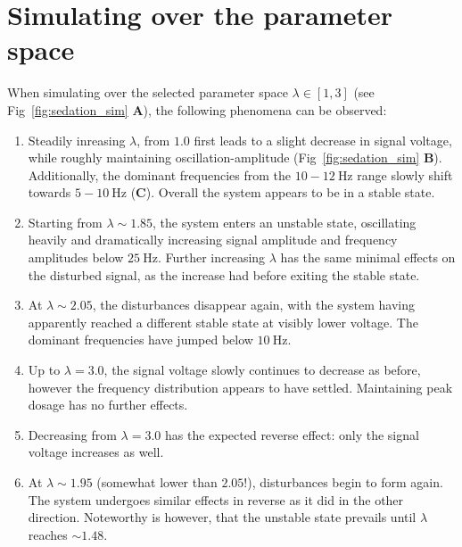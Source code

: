 \section{Simulating over the parameter space}\label{sec:simulating-over-the-parameter-space}

When simulating over the selected parameter space $ \lambda \in \left[ 1, 3 \right] $ (see Fig~\ref{fig:sedation_sim}
\textbf{A}),
the following phenomena can be observed:

\begin{enumerate}
    \item Steadily inreasing $ \lambda $, from $1.0$ first leads to a slight decrease in signal voltage, while roughly
    maintaining
    oscillation-amplitude (Fig~\ref{fig:sedation_sim} \textbf{B}).
    Additionally, the dominant frequencies from the $ 10-12 \SI{}{\hertz} $ range slowly shift towards $ 5-10
    \SI{}{\hertz} $ (\textbf{C}).
    Overall the system appears to be in a stable state.

    \item Starting from $ \lambda \sim 1.85 $, the system enters an unstable state, oscillating heavily and dramatically
    increasing signal amplitude and frequency amplitudes below $ \SI{25}{\hertz} $.
    Further increasing $\lambda$ has the same minimal effects on the disturbed signal,
    as the increase had before exiting the stable state.

    \item At $\lambda \sim 2.05 $, the disturbances disappear again, with the system having apparently reached a different
    stable state at visibly lower voltage.
    The dominant frequencies have jumped below $\SI{10}{\hertz}$.

    \item Up to $\lambda = 3.0$, the signal voltage slowly continues to decrease as before,
    however the frequency distribution appears to have settled.
    Maintaining peak dosage has no further effects.

    \item Decreasing from $\lambda = 3.0$ has the expected reverse effect: only the signal voltage increases as well.

    \item At $\lambda \sim 1.95$ (somewhat lower than $2.05$!), disturbances begin to form again.
    The system undergoes similar effects in reverse as it did in the other direction.
    Noteworthy is however, that the unstable state prevails until $\lambda$ reaches $\sim 1.48$.
\end{enumerate}




